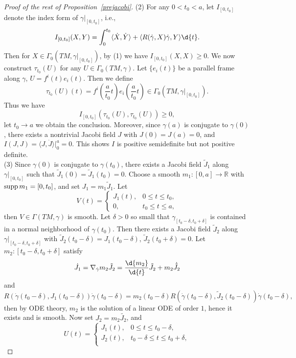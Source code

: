 \begin{proof}[Proof of the rest of Proposition~\ref{prejacobi}]
    (2) For any $0<t_0<a$, let $I_{[0,t_0]}$ denote the index form of $\gamma|_{[0,t_0]}$, i.e.,
    \[I_{[0,t_0]}(X,Y)=\int_{0}^{t_0}\langle \dot{X},\dot{Y}\rangle+\langle R(\dot\gamma,X)\dot\gamma,Y\rangle\d{t}.\]
    Then for $X\in\Gamma_0(TM,\gamma|_{[0,t_0]})$, by (1) we have $I_{[0,t_0]}(X,X)\geq 0$.
    We now construct $\tau_{t_0}(U)$ for any $U\in\Gamma_0(TM,\gamma)$.
    Let $\{e_i(t)\}$ be a parallel frame along $\gamma$, $U=f^i(t)e_i(t)$.
    Then we define
    \[\tau_{t_0}(U)(t)=f^i\left(\frac{a}{t_0}t\right)e_i\left(\frac{a}{t_0}t\right)\in\Gamma_0(TM,\gamma|_{[0,t_0]}).\]
    Thus we have
    \[I_{[0,t_0]}(\tau_{t_0}(U),\tau_{t_0}(U))\geq 0,\]
    let $t_0\to a$ we obtain the conclusion.
    Moreover, since $\gamma(a)$ is conjugate to $\gamma(0)$, there exists a nontrivial Jacobi field $J$ with $J(0)=J(a)=0$, and $I(J,J)=\langle J,\dot{J}\rangle|^a_0=0$.
    This shows $I$ is positive semidefinite but not positive definite.\\
    (3) Since $\gamma(0)$ is conjugate to $\gamma(t_0)$, there exists a Jacobi field $\tilde{J}_1$ along $\gamma|_{[0,t_0]}$ such that $\tilde{J}_1(0)=\tilde{J}_1(t_0)=0$.
    Choose a smooth $m_1:[0,a]\to\mathbb{R}$ with $\operatorname{supp}{m_1}=[0,t_0]$, and set $J_1=m_1\tilde{J}_1$.
    Let
    \[V(t)=\begin{cases}
        J_1(t), & 0\leq t\leq t_0,\\
        0, & t_0\leq t\leq a,
    \end{cases}\]
    then $V\in\Gamma(TM,\gamma)$ is smooth.
    Let $\delta>0$ so small that $\gamma_{[t_0-\delta,t_0+\delta]}$ is contained in a normal neighborhood of $\gamma(t_0)$.
    Then there exists a Jacobi field $\tilde{J}_2$ along $\gamma|_{[t_0-\delta,t_0+\delta]}$ with $\tilde{J}_2(t_0-\delta)=J_1(t_0-\delta)$, $\tilde{J}_2(t_0+\delta)=0$.
    Let $m_2:[t_0-\delta,t_0+\delta]$ satisfy
    \[\dot{J}_1=\nabla_{\dot\gamma}m_2\tilde{J}_2=\frac{\d{m_2}}{\d{t}}\tilde{J}_2+m_2\dot{\tilde{J}}_2\]
    and
    \[R(\dot\gamma(t_0-\delta),J_1(t_0-\delta))\dot\gamma(t_0-\delta)=m_2(t_0-\delta)R(\dot\gamma(t_0-\delta),\tilde{J}_2(t_0-\delta))\dot\gamma(t_0-\delta),\]
    then by ODE theory, $m_2$ is the solution of a linear ODE of order $1$, hence it exists and is smooth.
    Now set $J_2=m_2\tilde{J_2}$, and
    \[U(t)=\begin{cases}
        J_1(t), & 0\leq t\leq t_0-\delta,\\
        J_2(t), & t_0-\delta\leq t\leq t_0+\delta,\\

\end{cases}\]
\end{proof}
